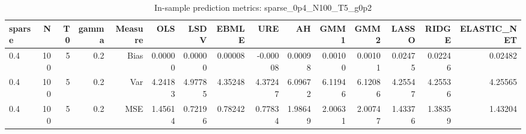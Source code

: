 \begin{table}[!htbp]\centering
\caption{In-sample prediction metrics: sparse_0p4_N100_T5_g0p2}
\label{tab:table2_sparse_0p4_N100_T5_g0p2}
\begin{tabular}{lrrrrrrrrrrrrrr}
\hline
sparse & N & T0 & gamma & Measure & OLS & LSDV & EBMLE & URE & AH & GMM1 & GMM2 & LASSO & RIDGE & ELASTIC_NET \\
\hline
0.4 & 100 & 5 & 0.2 & Bias & 0.00000 & 0.00000 & 0.00008 & -0.00008 & 0.00098 & 0.00100 & 0.00101 & 0.02475 & 0.02246 & 0.02482 \\
0.4 & 100 & 5 & 0.2 & Var & 4.24183 & 4.97785 & 4.35248 & 4.37247 & 6.09672 & 6.11946 & 6.12086 & 4.25547 & 4.25536 & 4.25565 \\
0.4 & 100 & 5 & 0.2 & MSE & 1.45614 & 0.72196 & 0.78242 & 0.77834 & 1.98649 & 2.00631 & 2.00747 & 1.43376 & 1.38359 & 1.43204 \\
\hline
\end{tabular}
\end{table}

